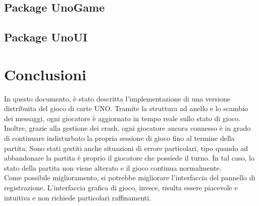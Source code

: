 \documentclass[11pt]{article} %
\begin{document}
\subsection{Package UnoGame}

\subsection{Package UnoUI}

\section{Conclusioni}
In questo documento, è stato descritta l'implementazione di una versione distribuita del gioco di carte UNO. Tramite la struttura ad anello e 
lo scambio dei messaggi, ogni giocatore è aggiornato in tempo reale sullo stato di gioco. 
Inoltre, grazie alla gestione dei crash, ogni giocatore ancora connesso è in grado di continuare indisturbato
la propria sessione di gioco fino al termine della partita. Sono stati gestiti anche situazioni di errore particolari, tipo quando ad abbandonare la partita
è proprio il giocatore che possiede il turno. In tal caso, lo stato della partita non viene alterato e il gioco continua normalmente.\\
Come possibile miglioramento, si potrebbe migliorare l'interfaccia del pannello di registrazione.
L'interfaccia grafica di gioco, invece, risulta essere piacevole e intuitiva e non richiede particolari raffinamenti.  
\end{document}
